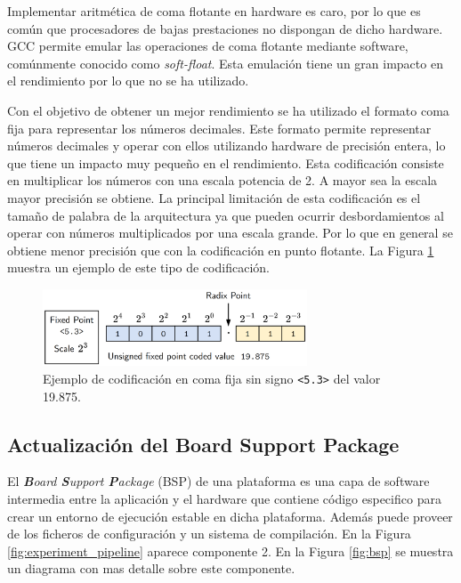 Implementar aritmética de coma flotante en hardware es caro, por lo que es común que procesadores de bajas prestaciones no dispongan de dicho hardware. GCC permite emular las operaciones de coma flotante mediante software, comúnmente conocido como \textit{soft-float}. Esta emulación tiene un gran impacto en el rendimiento por lo que no se ha utilizado.

Con el objetivo de obtener un mejor rendimiento se ha utilizado el formato coma fija para representar los números decimales. Este formato permite representar números decimales y operar con ellos utilizando hardware de precisión entera, lo que tiene un impacto muy pequeño en el rendimiento. Esta codificación consiste en multiplicar los números con una escala potencia de 2. A mayor sea la escala mayor precisión se obtiene. La principal limitación de esta codificación es el tamaño de palabra de la arquitectura ya que pueden ocurrir desbordamientos al operar con números multiplicados por una escala grande. Por lo que en general se obtiene menor precisión que con la codificación en punto flotante. La Figura \ref{fig:fixed_point} muestra un ejemplo de este tipo de codificación.

\begin{figure}[h]
    \centering
    \includegraphics[width=0.7\textwidth]{root/Imagenes/metodologia/fixed_point.png}
    \caption{Ejemplo de codificación en coma fija sin signo \texttt{<5.3>} del valor 19.875.}
    \label{fig:fixed_point}
\end{figure}

\subsection{Actualización del Board Support Package}

El \textit{\textbf{B}oard \textbf{S}upport \textbf{P}ackage} (BSP) de una plataforma es una capa de software intermedia entre la aplicación y el hardware que contiene código especifico para crear un entorno de ejecución estable en dicha plataforma. Además puede proveer de los ficheros de configuración y un sistema de compilación. En la Figura \ref{fig:experiment_pipeline} aparece componente 2. En la Figura \ref{fig:bsp} se muestra un diagrama con mas detalle sobre este componente.

